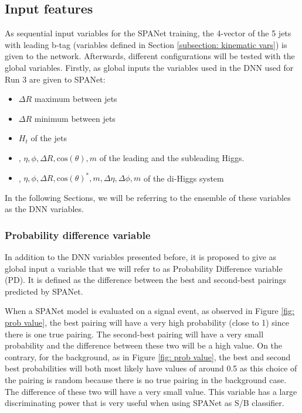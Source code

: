 \subsection{Input features}

As sequential input variables for the SPANet training, the 4-vector of the 5 jets with leading b-tag (variables defined in Section \ref{subsection: kinematic vars}) is given to the network. Afterwards, different configurations will be tested with the global variables. Firstly, as global inputs the variables used in the DNN used for Run 3 \cite{ANRun3} are given to SPANet:

\begin{itemize}
    \item $\Delta R$ maximum between jets
    \item $\Delta R$ minimum between jets
    \item $H_t$ of the jets
    \item \pt, $\eta, \phi, \Delta R, \text{cos}(\theta), m$ of the leading and the subleading Higgs.
    \item \pt, $\eta, \phi, \Delta R, \text{cos}(\theta)^*, m, \Delta\eta, \Delta \phi, m$ of the di-Higgs system
\end{itemize}

\noindent In the following Sections, we will be referring to the ensemble of these variables as the {DNN variables}.


\subsubsection{Probability difference variable} \label{subsubsection: PD var}

In addition to the DNN variables presented before, it is proposed to give as global input a variable that we will refer to as {Probability Difference variable} (PD). It is defined as the difference between the best and second-best pairings predicted by SPANet.

When a SPANet model is evaluated on a signal event, as observed in Figure \ref{fig: prob value}, the best pairing will have a very high probability (close to 1) since there is one true pairing. The second-best pairing will have a very small probability and the difference between these two will be a high value. On the contrary, for the background, as in Figure \ref{fig: prob value}, the best and second best probabilities will both most likely have values of around 0.5 as this choice of the pairing is random because there is no true pairing in the background case. The difference of these two will have a very small value. This variable has a large discriminating power that is very useful when using SPANet as S/B classifier.

